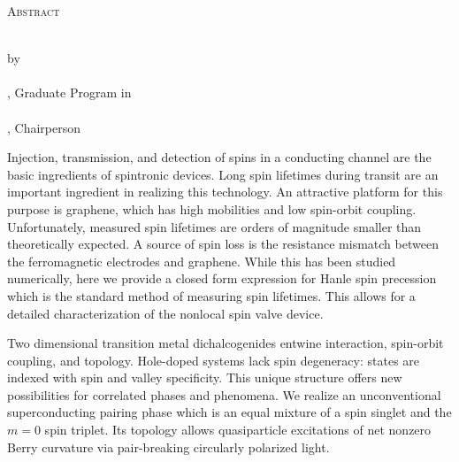 \clearpage
\centering
\vspace*{-\toptafiddle}

\textsc{Abstract}

\thetitle{} \\
by \\
\theauthor{} \\

\thedegree, Graduate Program in \thefield{} \\
\theuniversity{} \\
\thechair{}, Chairperson \\
\thedate{}

\justify{}
Injection, transmission, and detection of spins in a conducting channel
are the basic ingredients of spintronic devices.
Long spin lifetimes during transit
are an important ingredient in realizing this technology.
An attractive platform for this purpose is graphene, which has high mobilities
and low spin-orbit coupling.
Unfortunately, measured spin lifetimes are orders of magnitude smaller
than theoretically expected.
A source of spin loss is the resistance mismatch between
the ferromagnetic electrodes and graphene.
While this has been studied numerically,
here we provide a closed form expression for Hanle spin precession
which is the standard method of measuring spin lifetimes.
This allows for a detailed characterization of the nonlocal spin valve device.

Two dimensional transition metal dichalcogenides entwine
interaction, spin-orbit coupling, and topology.
Hole-doped systems lack spin degeneracy:
states are indexed with spin and valley specificity.
This unique structure offers new possibilities
for correlated phases and phenomena.
We realize an unconventional superconducting pairing phase
which is an equal mixture of a spin singlet and the $m = 0$ spin triplet.
Its topology allows quasiparticle excitations
of net nonzero Berry curvature via pair-breaking circularly polarized light.

\enlargethispage{\bottafiddle}
\clearpage
